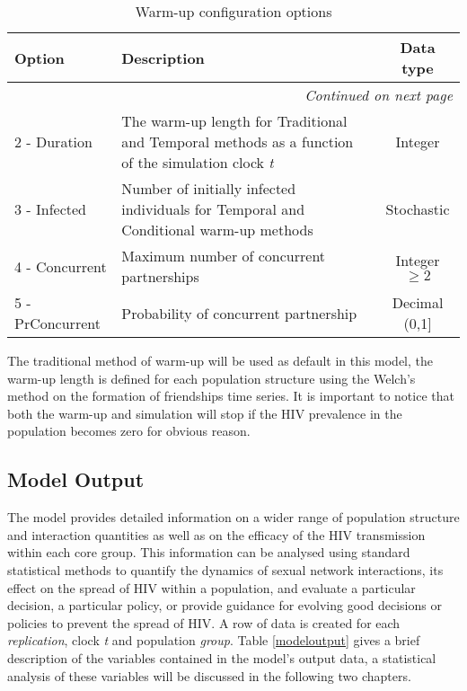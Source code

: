 \begin{longtable}[c]{|l|p{8.5cm}|c|}
\caption{Warm-up configuration options}\\\hline
\bfseries Option & \bfseries Description & \bfseries Data type\\\hline\hline
\endhead
\multicolumn{3}{r}{\emph{Continued on next page}}
\endfoot
\endlastfoot
\label{warmupconfig}
1 - Method        & The warm-up method to be considered & \ref{modelwarmup} \\\hline
2 - Duration      & The warm-up length for Traditional and Temporal methods as a
function of the simulation clock \emph{t} & Integer \\\hline
3 - Infected      & Number of initially infected individuals for Temporal and Conditional
warm-up methods   & Stochastic \\\hline
4 - Concurrent    & Maximum number of concurrent partnerships & Integer $\geq 2$ \\\hline
5 - PrConcurrent  & Probability of concurrent partnership & Decimal (0,1] \\\hline
\end{longtable}

The traditional method of warm-up will be used as default in this model, the warm-up
length is defined for each population structure using the Welch's method
\cite{Welch1983,Welch1981} on the formation of friendships time series. It is important
to notice that both the warm-up and simulation will stop if the HIV prevalence in the
population becomes zero for obvious reason.

\subsection{Model Output}

The model provides detailed information on a wider range of population structure and
interaction quantities as well as on the efficacy of the HIV transmission within each
core group. This information can be analysed using standard statistical methods to
quantify the dynamics of sexual network interactions, its effect on the spread of HIV
within a population, and evaluate a particular decision, a particular policy, or provide
guidance for evolving good decisions or policies to prevent the spread of HIV. A row of
data is created for each \emph{replication}, clock \emph{t} and population \emph{group}.
Table \ref{modeloutput} gives a brief description of the variables contained in the
model's output data, a statistical analysis of these variables will be discussed in the
following two chapters.

